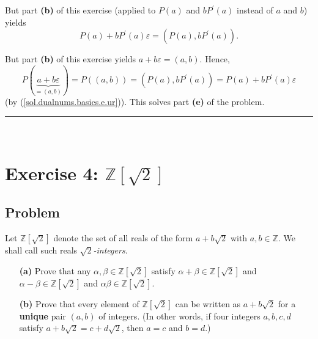 \documentclass[paper=a4, fontsize=12pt]{scrartcl}%
\theoremstyle{plainsl}
\theoremstyle{definition}
\theoremstyle{remark}
\begin{document}
But part \textbf{(b)} of this exercise (applied to $P\left(  a\right)  $ and
$bP^{\prime}\left(  a\right)  $ instead of $a$ and $b$) yields
\begin{equation}
P\left(  a\right)  +bP^{\prime}\left(  a\right)  \varepsilon=\left(  P\left(
a\right)  ,bP^{\prime}\left(  a\right)  \right)  .
\label{sol.dualnums.basics.e.ur}%
\end{equation}


But part \textbf{(b)} of this exercise yields $a+b\varepsilon=\left(
a,b\right)  $. Hence,%
\[
P\left(  \underbrace{a+b\varepsilon}_{=\left(  a,b\right)  }\right)  =P\left(
\left(  a,b\right)  \right)  =\left(  P\left(  a\right)  ,bP^{\prime}\left(
a\right)  \right)  =P\left(  a\right)  +bP^{\prime}\left(  a\right)
\varepsilon
\]
(by (\ref{sol.dualnums.basics.e.ur})). This solves part \textbf{(e)} of the problem.

\rule{\linewidth}{0.3pt} \\[0.4cm]

\section{Exercise 4: $\mathbb{Z}\left[  \sqrt2 \right]  $}

\subsection{Problem}

Let $\mathbb{Z}\left[  \sqrt2 \right]  $ denote the set of all reals of the
form $a + b \sqrt2$ with $a, b \in\mathbb{Z}$. We shall call such reals
\textit{$\sqrt2$-integers}.

\begin{enumerate}
\item[\textbf{(a)}] Prove that any $\alpha, \beta\in\mathbb{Z}\left[  \sqrt2
\right]  $ satisfy $\alpha+ \beta\in\mathbb{Z}\left[  \sqrt2 \right]  $ and
$\alpha- \beta\in\mathbb{Z}\left[  \sqrt2 \right]  $ and $\alpha\beta
\in\mathbb{Z}\left[  \sqrt2 \right]  $.

\item[\textbf{(b)}] Prove that every element of $\mathbb{Z}\left[  \sqrt2
\right]  $ can be written as $a + b \sqrt2$ for a \textbf{unique} pair
$\left(  a, b \right)  $ of integers. (In other words, if four integers $a, b,
c, d$ satisfy $a + b \sqrt2 = c + d \sqrt2$, then $a = c$ and $b = d$.)
\end{enumerate}
\end{document}
